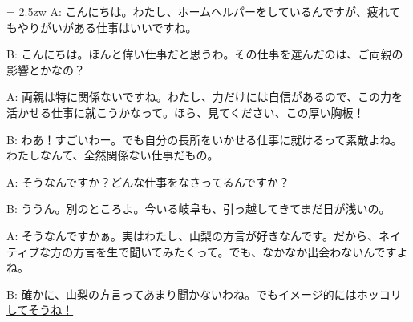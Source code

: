 \documentclass[11pt]{amsart}
\title{}
\author{}
\newenvironment{hangall}[1]{\hangindent = 2.5zw\everypar{\hangindent = 2.5zw}}{}
\begin{document}
\maketitle
\begin{hangall}{}%
A: こんにちは。わたし、ホームヘルパーをしているんですが、疲れてもやりがいがある仕事はいいですね。

B: こんにちは。ほんと偉い仕事だと思うわ。その仕事を選んだのは、ご両親の影響とかなの？

A: 両親は特に関係ないですね。わたし、力だけには自信があるので、この力を活かせる仕事に就こうかなって。ほら、見てください、この厚い胸板！

B: わあ！すごいわー。でも自分の長所をいかせる仕事に就けるって素敵よね。わたしなんて、全然関係ない仕事だもの。

A: そうなんですか？どんな仕事をなさってるんですか？

B: ううん。別のところよ。今いる岐阜も、引っ越してきてまだ日が浅いの。

A: そうなんですかぁ。実はわたし、山梨の方言が好きなんです。だから、ネイティブな方の方言を生で聞いてみたくって。でも、なかなか出会わないんですよね。

B: \ul{確かに、山梨の方言ってあまり聞かないわね。でもイメージ的にはホッコリしてそうね！}\end{hangall}
\end{document}
